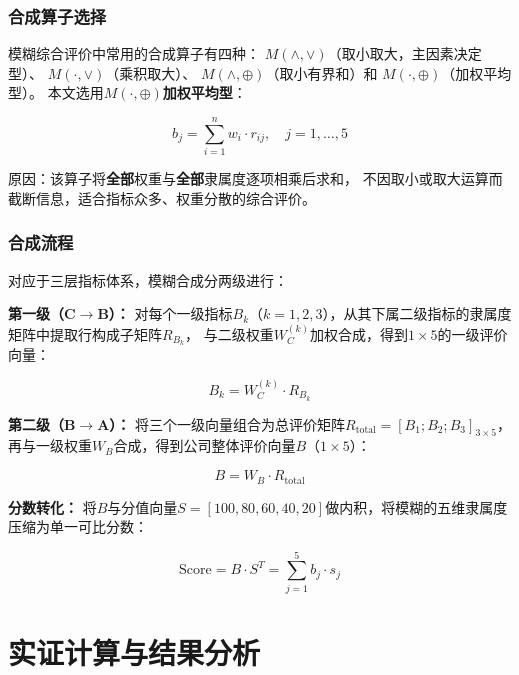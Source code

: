 \documentclass[a4paper,12pt]{ctexart}
\begin{document}
\subsubsection{合成算子选择}

模糊综合评价中常用的合成算子有四种\cite{xie2000}：
$M(\wedge,\vee)$（取小取大，主因素决定型）、
$M(\cdot,\vee)$（乘积取大）、
$M(\wedge,\oplus)$（取小有界和）和
$M(\cdot,\oplus)$（加权平均型）。
本文选用\textbf{$M(\cdot,\oplus)$加权平均型}：

\begin{equation}
    b_j = \sum_{i=1}^{n} w_i \cdot r_{ij}, \quad j = 1,\ldots,5
\label{eq:weighted_avg}
\end{equation}

原因：该算子将\textbf{全部}权重与\textbf{全部}隶属度逐项相乘后求和，
不因取小或取大运算而截断信息，适合指标众多、权重分散的综合评价\cite{chen2000}。

\subsubsection{合成流程}

对应于三层指标体系，模糊合成分两级进行：

\textbf{第一级（C$\rightarrow$B）：}
对每个一级指标$B_k$（$k=1,2,3$），从其下属二级指标的隶属度矩阵中提取行构成子矩阵$R_{B_k}$，
与二级权重$W_C^{(k)}$加权合成，得到$1\times 5$的一级评价向量：

\begin{equation}
    B_k = W_{C}^{(k)} \cdot R_{B_k}
\label{eq:first_level}
\end{equation}

\textbf{第二级（B$\rightarrow$A）：}
将三个一级向量组合为总评价矩阵$R_{\text{total}} = [B_1; B_2; B_3]_{3\times 5}$，
再与一级权重$W_B$合成，得到公司整体评价向量$B$（$1\times 5$）：

\begin{equation}
    B = W_{B} \cdot R_{\text{total}}
\label{eq:second_level}
\end{equation}

\textbf{分数转化：}
将$B$与分值向量$S=[100,80,60,40,20]$做内积，将模糊的五维隶属度压缩为单一可比分数：

\begin{equation}
    \text{Score} = B \cdot S^{T} = \sum_{j=1}^{5} b_j \cdot s_j
\label{eq:score}
\end{equation}

\section{实证计算与结果分析}
\end{document}
